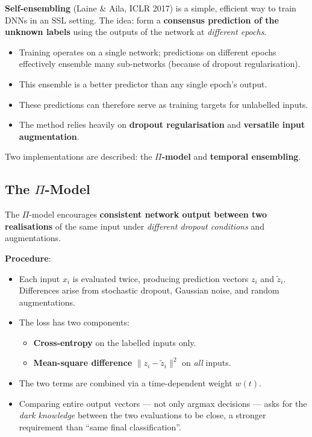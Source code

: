 \documentclass[11pt,a4paper]{article}
\theoremstyle{definition}
\theoremstyle{plain}
\theoremstyle{remark}
\begin{document}
\textbf{Self-ensembling} (Laine \& Aila, ICLR 2017) is a simple, efficient way to train DNNs in an SSL setting. The idea: form a \textbf{consensus prediction of the unknown labels} using the outputs of the network at \emph{different epochs}.

\begin{itemize}
    \item Training operates on a single network; predictions on different epochs effectively ensemble many sub-networks (because of dropout regularisation).
    \item This ensemble is a better predictor than any single epoch's output.
    \item These predictions can therefore serve as training targets for unlabelled inputs.
    \item The method relies heavily on \textbf{dropout regularisation} and \textbf{versatile input augmentation}.
\end{itemize}

Two implementations are described: the \textbf{$\Pi$-model} and \textbf{temporal ensembling}.

\subsection{The $\Pi$-Model}

The $\Pi$-model encourages \textbf{consistent network output between two realisations} of the same input under \emph{different dropout conditions} and augmentations.

\textbf{Procedure}:
\begin{itemize}
    \item Each input $x_i$ is evaluated twice, producing prediction vectors $z_i$ and $\widetilde{z}_i$. Differences arise from stochastic dropout, Gaussian noise, and random augmentations.
    \item The loss has two components:
    \begin{itemize}
        \item \textbf{Cross-entropy} on the labelled inputs only.
        \item \textbf{Mean-square difference} $\|z_i - \widetilde{z}_i\|^2$ on \emph{all} inputs.
    \end{itemize}
    \item The two terms are combined via a time-dependent weight $w(t)$.
    \item Comparing entire output vectors --- not only argmax decisions --- asks for the \emph{dark knowledge} between the two evaluations to be close, a stronger requirement than ``same final classification''.
\end{itemize}
\end{document}
